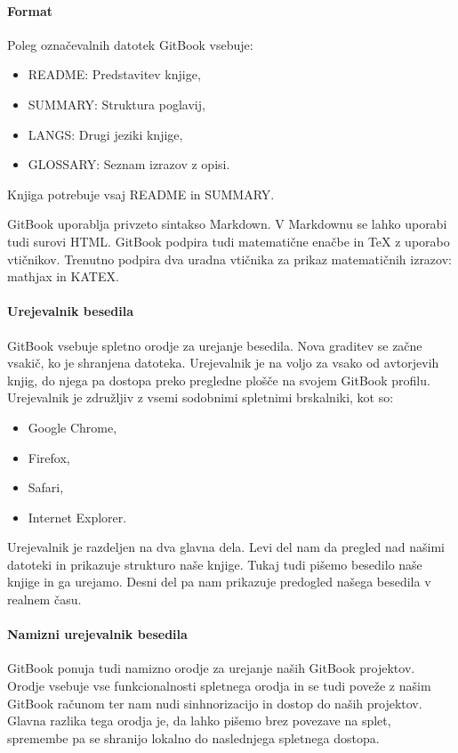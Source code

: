 \documentclass[a4paper, 12pt]{book}
\begin{document}
\paragraph{Format}
Poleg označevalnih datotek GitBook vsebuje:
\begin{itemize}
	\item README: Predstavitev knjige,
	\item SUMMARY:  Struktura poglavij,
	\item LANGS: Drugi jeziki knjige,
	\item GLOSSARY: Seznam izrazov z opisi.
\end{itemize}
Knjiga potrebuje vsaj README in SUMMARY. 

GitBook uporablja privzeto sintakso Markdown. V Markdownu se lahko uporabi tudi surovi HTML. GitBook podpira tudi matematične enačbe in TeX z uporabo vtičnikov. Trenutno podpira dva uradna vtičnika za prikaz matematičnih izrazov: mathjax in KATEX. 

\paragraph{Urejevalnik besedila}
GitBook vsebuje spletno orodje za urejanje besedila. Nova graditev se začne vsakič, ko je shranjena datoteka. Urejevalnik je na voljo za vsako od avtorjevih knjig, do njega pa dostopa preko pregledne plošče na svojem GitBook profilu. Urejevalnik je združljiv z vsemi sodobnimi spletnimi brskalniki, kot so:
\begin{itemize}
	\item Google Chrome,
	\item Firefox,
	\item Safari,
	\item Internet Explorer. 
\end{itemize}
Urejevalnik je razdeljen na dva glavna dela. Levi del nam da pregled nad našimi datoteki in prikazuje strukturo naše knjige. Tukaj tudi pišemo besedilo naše knjige in ga urejamo. Desni del pa nam prikazuje predogled našega besedila v realnem času.

\paragraph{Namizni urejevalnik besedila}
GitBook ponuja tudi namizno orodje za urejanje naših GitBook projektov. Orodje vsebuje vse funkcionalnosti spletnega orodja in se tudi poveže z našim GitBook računom ter nam nudi sinhnorizacijo in dostop do naših projektov. Glavna razlika tega orodja je, da lahko pišemo brez povezave na splet, spremembe pa se shranijo lokalno do naslednjega spletnega dostopa.
\end{document}
